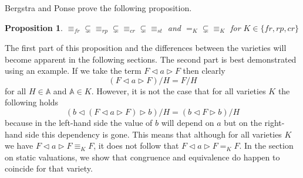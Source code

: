 \documentclass[a4paper,twoside,openright]{report}
\newcommand{\lef}{\ensuremath{\triangleleft}}
\newcommand{\rig}{\ensuremath{\triangleright}}
\newtheorem{prop}[theorem]{Proposition}
\begin{document}
Bergstra and Ponse prove the following proposition.
\begin{prop}\label{variety relation prop}
$\equiv_{fr}\subsetneq\equiv_{rp}\subsetneq\equiv_{cr}\subsetneq\equiv_{st}$ and $=_K\subsetneq\equiv_K$ for $K\in\{fr,rp,cr\}$
\end{prop}
The first part of this proposition and  the differences between the varieties will become apparent in the following sections. The second part is best demonstrated using an example. If we take the term $F\lef a\rig F$ then clearly
\[
(F\lef a\rig F)/H=F/H
\] 
for all $H\in\mathbb{A}$ and $\mathbb{A}\in K$. However, it is not the case that for all varieties $K$ the following holds
\[
(b\lef (F\lef a\rig F)\rig b)/H=(b\lef F\rig b)/H
\]
because in the left-hand side the value of $b$ will depend on $a$ but on the right-hand side this dependency is gone. This means that although for all varieties $K$ we have $F\lef a\rig F\equiv_K F$, it does not follow that $F\lef a\rig F=_K F$. In the section on static valuations, we show that congruence and equivalence do happen to coincide for that variety.
\end{document}
